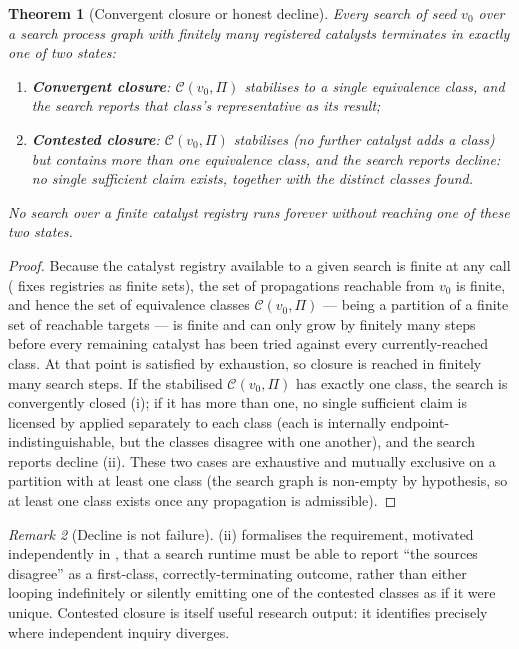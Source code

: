 \documentclass[11pt,twocolumn,a4paper]{article}
\theoremstyle{thmstyle}
\newtheorem{theorem}{Theorem}[section]
\theoremstyle{definition}
\theoremstyle{remark}
\newtheorem{remark}[theorem]{Remark}
\newcommand{\Proc}{\Pi}
\newcommand{\Cell}{\mathcal{C}}
\begin{document}
\begin{theorem}[Convergent closure or honest decline]
\label{thm:decline}
Every search of seed $v_0$ over a search process graph with finitely many
registered catalysts terminates in exactly one of two states:
\begin{enumerate}[label=\textup{(\roman*)},leftmargin=2.2em]
\item \textbf{Convergent closure}: $\Cell(v_0,\Proc)$ stabilises to a
single equivalence class, and the search reports that class's
representative as its result;
\item \textbf{Contested closure}: $\Cell(v_0,\Proc)$ stabilises (no further
catalyst adds a class) but contains more than one equivalence class, and
the search reports \emph{decline}: no single sufficient claim exists,
together with the distinct classes found.
\end{enumerate}
No search over a finite catalyst registry runs forever without reaching
one of these two states.
\end{theorem}

\begin{proof}
Because the catalyst registry available to a given search is finite at any
call ( fixes registries as finite sets), the set
of propagations reachable from $v_0$ is finite, and hence the set of
equivalence classes $\Cell(v_0,\Proc)$ --- being a partition of a finite
set of reachable targets --- is finite and can only grow by finitely many
steps before every remaining catalyst has been tried against every
currently-reached class. At that point  is satisfied by
exhaustion, so closure is reached in finitely many search steps. If the
stabilised $\Cell(v_0,\Proc)$ has exactly one class, the search is
convergently closed (i); if it has more than one, no single sufficient
claim is licensed by  applied separately to each class
(each is internally endpoint-indistinguishable, but the classes disagree
with one another), and the search reports decline (ii). These two cases
are exhaustive and mutually exclusive on a partition with at least one
class (the search graph is non-empty by hypothesis, so at least one class
exists once any propagation is admissible).
\end{proof}

\begin{remark}[Decline is not failure]
\label{rem:decline-not-failure}
(ii) formalises the requirement, motivated independently
in , that a search runtime must be able to report
``the sources disagree'' as a first-class, correctly-terminating outcome,
rather than either looping indefinitely or silently emitting one of the
contested classes as if it were unique. Contested closure is itself useful
research output: it identifies precisely where independent inquiry
diverges.
\end{remark}
\end{document}
